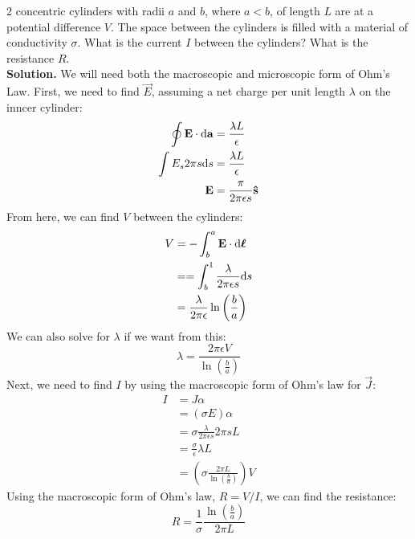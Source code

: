 \documentclass[a4paper]{article}
\begin{document}
\begin{eg}
	2 concentric cylinders with radii $a$ and $b$, where $a<b$, of length
	$L$ are at a potential difference $V$. The space between the cylinders
	is filled with a material of conductivity $\sigma$. What is the
	current $I$ between the cylinders? What is the resistance $R$.\\
	\textbf{Solution.}
	We will need both the macroscopic and microscopic form of Ohm's Law.
	First, we need to find $\vec{E}$, assuming a net charge per unit
	length $\lambda$ on the inncer cylinder:
	\begin{align*}
		\oint \boldsymbol{\mathbf{E}}\cdot\mathrm{d}\boldsymbol{\mathbf{a}} &= \frac{\lambda L}{\epsilon}\\
		\int E_s 2\pi s\mathrm{d} s &= \frac{\lambda L}{\epsilon}\\
		\boldsymbol{\mathbf{E}} &= \frac{\pi}{2\pi\epsilon s}\boldsymbol{\mathbf{\hat{s}}}
	\end{align*}
	From here, we can find $V$ between the cylinders:
	\begin{align*}
		V &= -\int_b^a \boldsymbol{\mathbf{E}} \cdot \mathrm{d}\boldsymbol{\mathbf{\ell}}\\
		  &= =\int_b^1 \frac{\lambda}{2\pi\epsilon s} \mathrm{d} s\\
		  &= \frac{\lambda}{2\pi \epsilon} \ln\left(\frac{b}{a}\right)
	\end{align*}
	We can also solve for $\lambda$ if we want from this:
	\[
		\lambda = \frac{2\pi\epsilon V}{\ln\left(\frac{b}{a}\right)}
	\]
	Next, we need to find $I$ by using the macroscopic form of Ohm's law
	for $\vec{J}$:
	\begin{align*}
		I &= J\alpha\\
		  &= (\sigma E)\alpha\\
		  &= \sigma\frac{\lambda}{2\pi\epsilon s}2\pi s L\\
		  &= \frac{\sigma}{\epsilon}\lambda L\\
		  &= \left(\sigma \frac{2\pi L}{\ln\left(\frac{b}{a}\right)}
			\right) V
	\end{align*}
	Using the macroscopic form of Ohm's law, $R = V/I$, we can find the
	resistance:
	\[ R = \frac{1}{\sigma}\frac{\ln\left(\frac{b}{a}\right)}{2\pi L} \]
\end{eg}
\end{document}
